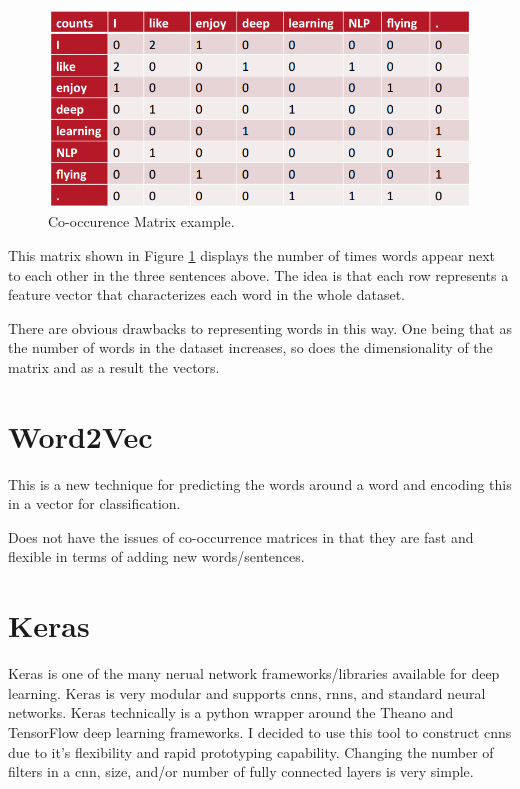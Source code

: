 \documentclass[12pt]{article}
\begin{document}
\begin{figure}[htbp!]
	\centering
	\includegraphics[scale=.4]{cooccurence.png}
	\caption{Co-occurence Matrix example.}
	\label{fig:cooccurence}
\end{figure}

This matrix shown in Figure \ref{fig:cooccurence} displays the number of times words appear next to each other in the three sentences above. The idea is that each row represents a feature vector that characterizes each word in the whole dataset.

There are obvious drawbacks to representing words in this way. One being that as the number of words in the dataset increases, so does the dimensionality of the matrix and as a result the vectors.

\section{Word2Vec}

This is a new technique \cite{word2vec} for predicting the words around a word and encoding this in a vector for classification.

Does not have the issues of co-occurrence matrices in that they are fast and flexible in terms of adding new words/sentences.

\section {Keras}
Keras \cite{chollet2015keras} is one of the many nerual network frameworks/libraries available for deep learning. Keras is very modular and supports \ac{cnn}s, \ac{rnn}s, and standard neural networks. Keras technically is a python wrapper around the Theano and TensorFlow deep learning frameworks. I decided to use this tool to construct \ac{cnn}s due to it's flexibility and rapid prototyping capability. Changing the number of filters in a \ac{cnn}, size, and\slash or number of fully connected layers is very simple. 
\end{document}
